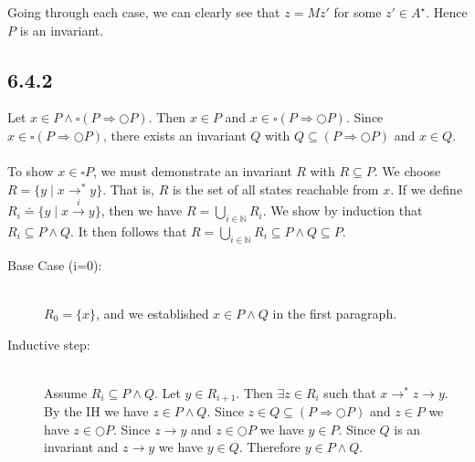\documentclass{article}
\begin{document}
Going through each case, we can clearly see that $z = Mz'$ for some $z' \in A^\star$. Hence $P$ is an invariant.


\subsection*{6.4.2}

Let $x \in P \wedge \square(P \Rightarrow \bigcirc P)$. Then $x \in P$ and $x \in \square(P \Rightarrow \bigcirc P)$.
Since $x \in \square (P \Rightarrow \bigcirc P)$, there exists an invariant $Q$ with $Q \subseteq (P \Rightarrow \bigcirc P)$ and $x \in Q$.\\~\\
To show $x \in \square P$, we must demonstrate an invariant $R$ with $R \subseteq P$. We choose $R = \{ y \mid x \rightarrow^* y \}$. That is, $R$ is the set of all states reachable from $x$. If we define $R_i \doteq \{ y \mid x \overset{i}{\rightarrow} y \}$, 
then we have $R = \bigcup_{i \in \mathbb N} R_i$. We show by induction that $R_i \subseteq P \wedge Q$. It then follows that $R = \bigcup_{i \in \mathbb N} R_i \subseteq P \wedge Q \subseteq P$.

\begin{description}
\item[Base Case (i=0):]~\\
$R_0 = \{ x \}$, and we established $x \in P \wedge Q$ in the first paragraph.
\item[Inductive step:]~\\
Assume $R_i \subseteq P \wedge Q$. Let $y \in R_{i+1}$. Then $\exists z \in R_i$ such that $x \rightarrow^* z \rightarrow y$.
By the IH we have $z \in P \wedge Q$. Since $z \in Q \subseteq (P \Rightarrow \bigcirc P)$ and $z \in P$ we have $z \in \bigcirc P$. Since $z \rightarrow y$ and $z \in \bigcirc P$ we have $y \in P$. Since $Q$ is an invariant and $z \rightarrow y$ we have $y \in Q$. Therefore $y \in P \wedge Q$.
\end{description}

 
\end{document}
